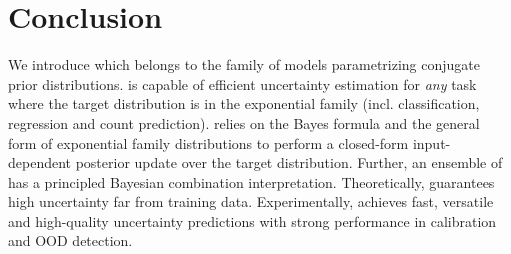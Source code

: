 \section{Conclusion}
\label{sec:conclusion_007}

We introduce \NatPN{} which belongs to the family of models parametrizing conjugate prior distributions.
\NatPNacro{} is capable of efficient uncertainty estimation for \emph{any} task where the target distribution is in the exponential family (incl. classification, regression and count prediction). \NatPNacro{} relies on the Bayes formula and the general form of exponential family distributions to perform a closed-form input-dependent posterior update over the target distribution. Further, an ensemble of  has a principled Bayesian combination interpretation. Theoretically, \NatPNacro{} guarantees high uncertainty far from training data. Experimentally, \NatPNacro{} achieves fast, versatile and high-quality uncertainty predictions with strong performance in calibration and OOD detection.
